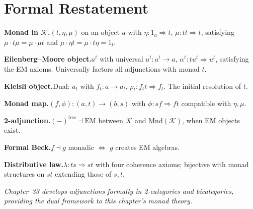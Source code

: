 \section*{Formal Restatement}

\begin{formalrestatement}
\textbf{Monad in $\mathcal{K}$.}\quad $(t, \eta, \mu)$ on an object $a$ with
$\eta : 1_a \Rightarrow t$, $\mu : tt \Rightarrow t$, satisfying
$\mu \cdot t \mu = \mu \cdot \mu t$ and $\mu \cdot \eta t = \mu \cdot t \eta
= 1_t$.

\medskip
\textbf{Eilenberg--Moore object.}\quad $a^t$ with universal $u^t : a^t \to a$,
$\alpha^t : t u^t \Rightarrow u^t$, satisfying the EM axioms. Universally
factors all adjunctions with monad $t$.

\medskip
\textbf{Kleisli object.}\quad Dual: $a_t$ with $f_t : a \to a_t$, $\rho_t :
f_t t \Rightarrow f_t$. The initial resolution of $t$.

\medskip
\textbf{Monad map.}\quad $(f, \phi) : (a, t) \to (b, s)$ with $\phi : s f
\Rightarrow f t$ compatible with $\eta, \mu$.

\medskip
\textbf{2-adjunction.}\quad $(-)^{\mathrm{free}} \dashv \mathrm{EM}$ between
$\mathcal{K}$ and $\mathrm{Mnd}(\mathcal{K})$, when EM objects exist.

\medskip
\textbf{Formal Beck.}\quad $f \dashv g$ monadic $\iff$ $g$ creates EM algebras.

\medskip
\textbf{Distributive law.}\quad $\lambda : ts \Rightarrow st$ with four
coherence axioms; bijective with monad structures on $st$ extending those
of $s, t$.

\medskip
\noindent\textit{Chapter~33 develops adjunctions formally in 2-categories
and bicategories, providing the dual framework to this chapter's monad
theory.}
\end{formalrestatement}

